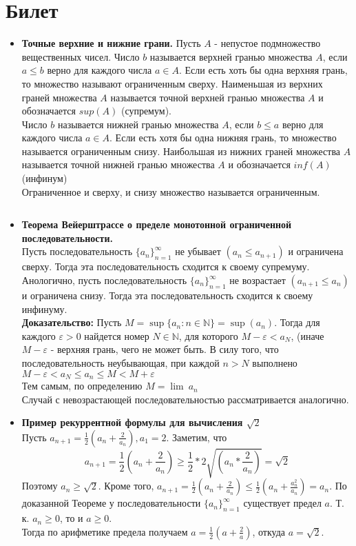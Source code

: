 \documentclass[12pt,a4paper]{article}
\begin{document}
\section{Билет}
\begin{itemize}
	\item \textbf{Точные верхние и нижние грани.}
	Пусть $A$ - непустое подмножество вещественных чисел.
	Число $b$ называется верхней гранью множества $A$, если $a \leq b$ верно для каждого числа $a \in A$. Если есть хоть бы одна верхняя грань, то множество называют ограниченным сверху. Наименьшая из верхних граней множества $A$ называется точной верхней гранью множества $A$ и обозначается $sup(A)$ (супремум).\\
	Число $b$ называется нижней гранью множества $A$, если $b \leq a$ верно для каждого числа $a \in A$. Если есть хотя бы одна нижняя грань, то множество называется ограниченным снизу. Наибольшая из нижних граней множества $A$ называется точной нижней гранью множества  $A$ и обозначается $inf(A)$ (инфинум)\\
	Ограниченное и сверху, и снизу множество называется ограниченным.

$\;$
\item \textbf{Теорема Вейерштрассе о пределе монотонной ограниченной последовательности.} \\
	Пусть последовательность $\{a_n\}_{n=1}^{\infty}$ не убывает $(a_n \leq a_{n + 1})$ и ограничена сверху. Тогда эта последовательность сходится к своему супремуму.\\
	Анологично, пусть последовательность $\{a_n\}_{n=1}^{\infty}$ не возрастает $(a_{n + 1} \leq a_n)$ и ограничена снизу. Тогда эта последовательность сходится к своему инфинуму.\\
	\textbf{Доказательство:} Пусть $M = \sup\{a_n : n \in \mathbb{N}\} = \sup(a_n)$. Тогда для каждого $\varepsilon > 0$ найдется номер $N \in \mathbb{N}$, для которого $M - \varepsilon < a_N$, (иначе $M - \varepsilon$ - верхняя грань, чего не может быть. В силу того, что последовательность неубывающая, при каждой $n > N$ выполнено $M - \varepsilon < a_N \leq a_n \leq M < M + \varepsilon $\\
	Тем самым, по определению $M = \lim\ a_n$\\
	Случай с невозрастающей последовательностью рассматривается аналогично.\\
	
\item \textbf{Пример рекуррентной формулы для вычисления $\sqrt2$\\}
	Пусть $a_{n + 1} = \frac{1}{2} (a_n + \frac{2}{a_n}), a_1 = 2$. Заметим, что
	 \[a_{n + 1} = \frac{1}{2} (a_n + \frac{2}{a_n}) \geq \frac{1}{2} * 2 \sqrt{(a_n * \frac{2}{a_n})} = \sqrt2\] 
	Поэтому $a_n \geq \sqrt2$. Кроме того, $a_{n + 1} = \frac{1}{2} (a_n + \frac{2}{a_n}) \leq \frac{1}{2} (a_n + \frac{a_n^2}{a_n}) = a_n$. По доказанной Теореме у последовательности $\{a_n\}_{n=1}^{\infty}$ существует предел $a$. Т. к. $a_n \geq 0$, то и $a \geq 0$.\\
	Тогда по арифметике предела получаем $a = \frac{1}{2} (a + \frac{2}{a})$, откуда $a = \sqrt2$.
	

\end{itemize}
\end{document}
